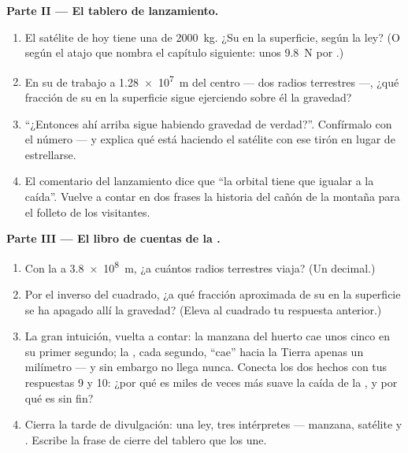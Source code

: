 \begin{problem}
\medskip\noindent\textbf{Parte II --- El tablero de lanzamiento.}
\begin{enumerate}[resume]
  \item El satélite de hoy tiene una  de \qty{2000}{kg}. ¿Su
         en la superficie, según la ley? (O según el atajo
        que nombra el capítulo siguiente: unos \qty{9.8}{N} por
        .)
  \item En su  de trabajo a \qty{1.28e7}{m} del centro
        --- dos radios terrestres ---, ¿qué fracción de su
         en la superficie sigue ejerciendo sobre él la
        gravedad?
  \item ``¿Entonces ahí arriba sigue habiendo gravedad de verdad?''.
        Confírmalo con el número --- y explica qué está haciendo el
        satélite con ese tirón en lugar de estrellarse.
  \item El comentario del lanzamiento dice que ``la
         orbital tiene que igualar a la caída''. Vuelve
        a contar en dos frases la historia del cañón de la montaña
        para el folleto de los visitantes.
\end{enumerate}

\medskip\noindent\textbf{Parte III --- El libro de cuentas de la
.}
\begin{enumerate}[resume]
  \item Con la  a \qty{3.8e8}{m}, ¿a cuántos radios
        terrestres viaja? (Un decimal.)
  \item Por el inverso del cuadrado, ¿a qué fracción aproximada de
        su  en la superficie se ha apagado allí la gravedad?
        (Eleva al cuadrado tu respuesta anterior.)
  \item La gran intuición, vuelta a contar: la manzana del huerto
        cae unos cinco  en su primer segundo; la
        , cada segundo, ``cae'' hacia la Tierra apenas un
        milímetro --- y sin embargo no llega nunca. Conecta los dos
        hechos con tus respuestas 9 y 10: ¿por qué es miles de veces
        más suave la caída de la , y por qué es sin fin?
  \item Cierra la tarde de divulgación: una ley, tres intérpretes
        --- manzana, satélite y . Escribe la frase de cierre
        del tablero que los une.
\end{enumerate}
\end{problem}

